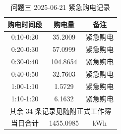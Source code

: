 \begin{table}[htbp]
\centering
\caption{问题三 2025-06-21 紧急购电记录}\label{tab:q3-emergency}
\normalsize\setlength{\tabcolsep}{6pt}
\begin{tabular}{@{}ccc@{}}
\toprule
购电时间段 & 购电量 & 备注 \\
\midrule
0:10-0:20 & 35.2009 & 紧急购电 \\
0:20-0:30 & 57.0999 & 紧急购电 \\
0:30-0:40 & 104.8654 & 紧急购电 \\
0:40-0:50 & 32.7603 & 紧急购电 \\
1:00-1:10 & 1.5729 & 紧急购电 \\
1:10-1:20 & 6.1632 & 紧急购电 \\
\multicolumn{3}{c}{其余 34 条记录见随附正式工作簿} \\
\midrule
当日合计 & 1455.0985 & kWh \\
\bottomrule
\end{tabular}
\end{table}
